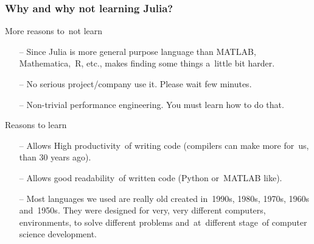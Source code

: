 \documentclass{beamer}  %
\begin{document}
\begin{frame}
  \frametitle{Why and why not learning Julia?}

  \begin{block}{More reasons to~not learn}
    \begin{itemize}
    \item[--] Since Julia is more general purpose language than
      MATLAB, Mathematica,~R, etc., makes finding some things a~little
      bit harder.
    \item[--] No serious project/company use it. Please wait few
      minutes.
    \item[--] Non-trivial performance engineering. You must learn how
      to do that.
    \end{itemize}
  \end{block}

  \begin{block}{Reasons to learn}
    \begin{itemize}
    \item[--] Allows High productivity~of writing code (compilers can
      make more for~us, than 30 years ago).
    \item[--] Allows good readability~of written code (Python
      or~MATLAB like).
    \item[--] Most languages we used are really old created in~1990s,
      1980s, 1970s, 1960s and~1950s. They were designed for very, very
      different computers, environments, to solve different problems
      and~at~different stage~of computer science development.
    \end{itemize}
  \end{block}
  
\end{frame}





\end{document}
